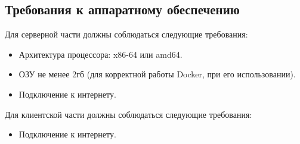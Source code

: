 \documentclass[requirements.tex]{subfiles}
\begin{document}
\subsection{Требования к аппаратному обеспечению}
\par
Для серверной части должны соблюдаться следующие требования: 
\begin{itemize}
    \item Архитектура процессора: x86-64 или amd64.
    \item ОЗУ не менее 2гб (для корректной работы Docker, при его использовании).
    \item Подключение к интернету.
\end{itemize}
\par
Для клиентской части должны соблюдаться следующие требования:
\begin{itemize}
    \item Подключение к интернету.
\end{itemize}
\end{document}
